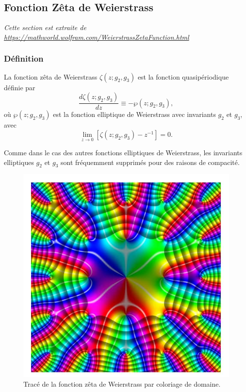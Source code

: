 \documentclass[12pt]{article}
\begin{document}
                        \subsection{Fonction Zêta de Weierstrass}
                        \textit{Cette section est extraite de \url{https://mathworld.wolfram.com/WeierstrassZetaFunction.html}}
                        \subsubsection{Définition}
                        La fonction zêta de Weierstrass $\zeta (z; g_2, g_3)$ est la fonction quasipériodique définie par
                        \[
                        \frac{d \zeta (z; g_2, g_3)}{dz} \equiv -\wp (z; g_2, g_3), \tag{1}
                        \]
                        où $\wp (z; g_2, g_3)$ est la fonction elliptique de Weierstrass avec invariants $g_2$ et $g_3$, avec
                        \[
                        \lim_{z \to 0} \left[ \zeta (z; g_2, g_3) - z^{-1} \right] = 0. \tag{2}
                        \]

                        Comme dans le cas des autres fonctions elliptiques de Weierstrass, les invariants elliptiques $g_2$ et $g_3$ sont fréquemment supprimés pour des raisons de compacité.
                        \begin{figure}
                            \centering
                            \includegraphics[width=\linewidth]{fonction_zeta.jpeg}
                            \caption{Tracé de la fonction zêta de Weierstrass par coloriage de domaine.}
                        \end{figure}
\end{document}
